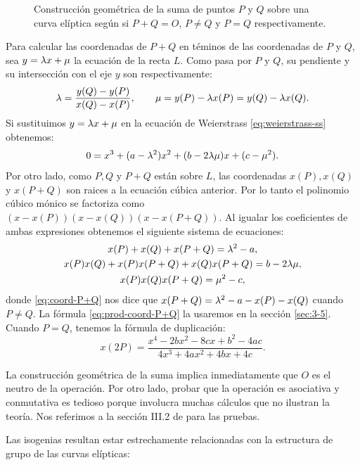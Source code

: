 \documentclass[../../tesis_maestria]{subfiles}
\begin{document}
\begin{figure}
\begin{minipage}[t]{0.3\textwidth}
\end{minipage}
\caption{Construcción geométrica de la suma de puntos $P$ y $Q$ sobre una curva elíptica según si $P+Q=O$, $P\neq Q$ y $P=Q$ respectivamente.}
\label{fig:suma-curva-eliptica}
\end{figure}

Para calcular las coordenadas de $P+Q$ en téminos de las coordenadas de $P$ y $Q$, sea $y=\lambda x+\mu$ la ecuación de la recta $L$. Como pasa por $P$ y $Q$, su pendiente y su intersección con el eje $y$ son respectivamente:
\[
	\lambda=\frac{y(Q)-y(P)}{x(Q)-x(P)},\qquad \mu=y(P)-\lambda x(P)=y(Q)-\lambda x(Q).
\]
Si sustituimos $y=\lambda x+\mu$ en la ecuación de Weierstrass \eqref{eq:weierstrass-ss} obtenemos:
\[
	0=x^3+(a-\lambda^2)x^2+(b-2\lambda\mu)x+(c-\mu^2).
\]
Por otro lado, como $P,Q$ y $P+Q$ están sobre $L$, las coordenadas $x(P),x(Q)$ y $x(P+Q)$ son raices a la ecuación cúbica anterior. Por lo tanto el polinomio cúbico mónico se factoriza como $(x-x(P))(x-x(Q))(x-x(P+Q))$. Al igualar los coeficientes de ambas expresiones obtenemos el siguiente sistema de ecuaciones:
\begin{gather}
	x(P)+x(Q)+x(P+Q)=\lambda^2-a, \label{eq:coord-P+Q}\\
	x(P)x(Q)+x(P)x(P+Q)+x(Q)x(P+Q)=b-2\lambda\mu,\nonumber\\
	x(P)x(Q)x(P+Q)=\mu^2-c, \label{eq:prod-coord-P+Q}
\end{gather}
donde \eqref{eq:coord-P+Q} nos dice que $x(P+Q)=\lambda^2-a-x(P)-x(Q)$ cuando $P\neq Q$. La fórmula \eqref{eq:prod-coord-P+Q} la usaremos en la sección \ref{sec:3-5}. Cuando $P=Q$, tenemos la fórmula de duplicación:
\begin{equation}
	x(2P)=\frac{x^4-2bx^2-8cx+b^2-4ac}{4x^3+4ax^2+4bx+4c}.
\end{equation}

La construcción geométrica de la suma implica inmediatamente que $O$ es el neutro de la operación. Por otro lado, probar que la operación es asociativa y conmutativa es tedioso porque involucra muchas cálculos que no ilustran la teoría. Nos referimos a la sección III.2 de \cite{SilvermanTAOEC} para las pruebas. 

Las isogenias resultan estar estrechamente relacionadas con la estructura de grupo de las curvas elípticas:
\end{document}
